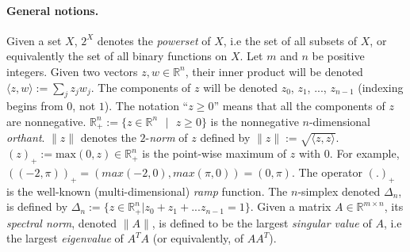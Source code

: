 \documentclass{article} %
\begin{document}
\paragraph{\textbf{General notions.}}
Given a set $X$, $2^X$ denotes the \emph{powerset} of $X$, i.e the set
of all subsets of $X$, or equivalently the set of all binary
functions on $X$. Let $m$ and $n$ be positive integers. Given two
vectors $z, w \in \mathbb{R}^n$, their inner product will be denoted
$\langle z, w\rangle := \sum_{j}z_jw_j$. The components of $z$ will be
denoted $z_0$, $z_1$, ..., $z_{n-1}$ (indexing begins from $0$,
not $1$). The notation ``$z \ge 0$'' means that all the components of
$z$ are nonnegative.
$\mathbb{R}^{n}_+ := \{z \in \mathbb{R}^{n}\text{ }|\text{ } z \geq
0\}$ is the nonnegative $n$-dimensional \textit{orthant}.  $\|z\|$ denotes the
$2$-\textit{norm} of $z$ defined by $\|z\| := \sqrt{\langle z,
  z\rangle}$. $(z)_+:=\text{max}(0, z) \in \mathbb{R}^{n}_+$ is the
point-wise maximum of $z$ with $0$. For example, $((-2, \pi))_+ =
(max(-2, 0), max(\pi, 0)) = (0, \pi)$. The operator $(.)_+$ is the
well-known (multi-dimensional) \textit{ramp} function. The
$n$-simplex denoted $\Delta_n$, is defined by $\Delta_n := \{z \in
\mathbb{R}^n_+|z_0 + z_1 + ... z_{n - 1} = 1\}$.
Given a matrix $A \in \mathbb{R}^{m \times n}$, its \textit{spectral
  norm}, denoted $\|A\|$, is
 defined to be the largest \textit{singular value} of $A$, i.e the
 largest \textit{eigenvalue} of $A^TA$ (or equivalently, of $AA^T$).
\end{document}
